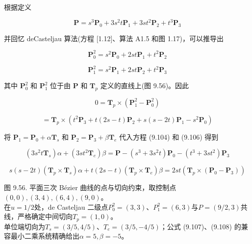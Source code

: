 \documentclass[../main.tex]{subfiles}
\begin{document}
根据定义

\[
\mathbf{P} = {s}^{3}{\mathbf{P}}_{0} + 3{s}^{2}t{\mathbf{P}}_{1} + {3s}{t}^{2}{\mathbf{P}}_{2} + {t}^{3}{\mathbf{P}}_{3} \tag{9.104}
\]

并回忆 deCasteljau 算法(方程 [1.12]、算法 A1.5 和图 1.17)，可以推导出

\[
{\mathbf{P}}_{0}^{2} = {s}^{2}{\mathbf{P}}_{0} + {2st}{\mathbf{P}}_{1} + {t}^{2}{\mathbf{P}}_{2}
\]

\[
{\mathbf{P}}_{1}^{2} = {s}^{2}{\mathbf{P}}_{1} + {2st}{\mathbf{P}}_{2} + {t}^{2}{\mathbf{P}}_{3} \tag{9.105}
\]

其中 \({\mathbf{P}}_{0}^{2}\) 和 \({\mathbf{P}}_{1}^{2}\) 位于由 \(\mathbf{P}\) 和 \({\mathbf{T}}_{p}\) 定义的直线上(图 9.56)。因此

\[
0 = {\mathbf{T}}_{p} \times  \left( {{\mathbf{P}}_{1}^{2} - {\mathbf{P}}_{0}^{2}}\right)
\]

\[
= {\mathbf{T}}_{p} \times  \left( {{t}^{2}{\mathbf{P}}_{3} + t\left( {{2s} - t}\right) {\mathbf{P}}_{2} + s\left( {s - {2t}}\right) {\mathbf{P}}_{1} - {s}^{2}{\mathbf{P}}_{0}}\right)  \tag{9.106}
\]

将 \({\mathbf{P}}_{1} = {\mathbf{P}}_{0} + \alpha {\mathbf{T}}_{s}\) 和 \({\mathbf{P}}_{2} = {\mathbf{P}}_{3} + \beta {\mathbf{T}}_{e}\) 代入方程 (9.104) 和 (9.106) 得到

\[
\left( {3{s}^{2}t{\mathbf{T}}_{s}}\right) \alpha  + \left( {{3s}{t}^{2}{\mathbf{T}}_{e}}\right) \beta  = \mathbf{P} - \left( {{s}^{3} + 3{s}^{2}t}\right) {\mathbf{P}}_{0} - \left( {{t}^{3} + {3s}{t}^{2}}\right) {\mathbf{P}}_{3} \tag{9.107}
\]

\[
s\left( {s - {2t}}\right) \left( {{\mathbf{T}}_{p} \times  {\mathbf{T}}_{s}}\right) \alpha  + t\left( {{2s} - t}\right) \left( {{\mathbf{T}}_{p} \times  {\mathbf{T}}_{e}}\right) \beta  = {2st}\left( {{\mathbf{T}}_{p} \times  \left( {{\mathbf{P}}_{0} - {\mathbf{P}}_{3}}\right) }\right)  \tag{9.108}
\]

\begin{center}
\begin{minipage}{29cm}
\vspace*{.6\baselineskip}
\centering
{}
\par\smallskip
图 9.56. 平面三次 Bézier 曲线的点与切向约束，取控制点$(0,0),(3,4),(6,4),(9,0)$。\\
在$u=1/2$处，de Casteljau 二级点$P_0^2=(3,3)$、$P_1^2=(6,3)$与$P=(9/2,3)$共线，严格确定中间切向$T_p=(1,0)$。\\
单位端切向为$T_s=(3/5,4/5)$、$T_e=(3/5,-4/5)$；公式 (9.107)、(9.108) 的兼容最小二乘系统精确给出$\alpha=5,\beta=-5$。
\end{minipage}
\end{center}
\end{document}
